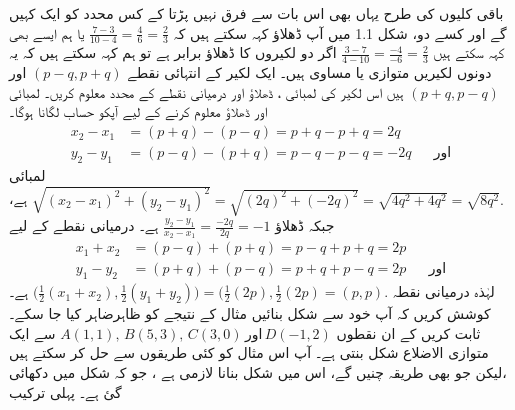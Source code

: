 باقی کلیوں کی طرح یہاں بھی اس بات سے فرق نہیں پڑتا کے کس محدد کو ایک کہیں گے اور کسے دو،  شکل 1.1 میں آپ ڈھلاؤ کہہ سکتے ہیں کہ \( \frac{7-3}{10-4} = \frac{4}{6} = \frac{2}{3} \) یا ہم ایسے بھی کہہ سکتے ہیں   \( \frac{3-7}{4-10} = \frac{-4}{-6} = \frac{2}{3} \)
اگر دو لکیروں کا ڈھلاؤ برابر ہے تو ہم کہہ سکتے ہیں کہ یہ دونوں لکیریں متوازی یا مساوی ہیں۔
ایک لکیر کے انتہائی نقطے \( (p-q, p+q) \) اور  \((p+q, p-q) \) ہیں 
اس لکیر کی لمبائی ، ڈھلاؤ اور درمیانی نقطے کے محدد معلوم کریں۔
لمبائی اور ڈھلاؤ معلوم کرنے کے لیے  آپکو حساب لگانا ہوگا۔
\begin{align*}
x_2 - x_1 &= (p+q) - (p-q) = p+q-p+q= 2q \\
y_2 - y_1& = (p-q) - (p+q) = p-q-p-q = -2q&&\text{اور}
\end{align*}
لمبائی
\( \sqrt{(x_2 - x_1 )^2 + (y_2 - y_1 )^2 }  = \sqrt{(2q)^2 + (-2q)^2}  = \sqrt{4q^2 + 4q^2 } = \sqrt{8q^2}.  \) 
 ہے، جبکہ ڈھلاؤ \( \frac{y_2 - y_1}{x_2 - x_1} = \frac{-2q}{2q} = -1 \) ہے۔
درمیانی نقطے کے لیے 
\begin{align*}
x_1 + x_2 &= (p -q) + (p+q) = p -q+p+q= 2 p \\
y_1 - y_2 &= (p+q) + (p -q) = p+q+p- q = 2 p&&\text{اور} 
\end{align*}
لہٰذہ درمیانی نقطہ \( \big( \frac{1}{2} (x_1 + x_2 ) , \frac{1}{2} (y_1 + y_2) \big) = \big( \frac{1}{2} (2p), \frac{1}{2} (2p)= (p,p). \)
ہے۔
کوشش کریں کہ آپ خود سے شکل بنائیں مثال کے نتیجے کو ظاہرضاہر کیا جا سکے۔
ثابت کریں کے ان نقطوں \(  A(1,1) , \, B(5,3), \, C(3,0) \, \text{اور} \, D(-1,2) \) سے ایک متوازی الاضلاع شکل بنتی ہے۔
آپ اس مثال کو کئی طریقوں سے حل کر سکتے ہیں ،لیکن جو بھی طریقہ چنیں گے، اس میں شکل بنانا لازمی ہے ، جو کہ شکل  میں دکھائی گئ ہے۔
پہلی ترکیب  
  
